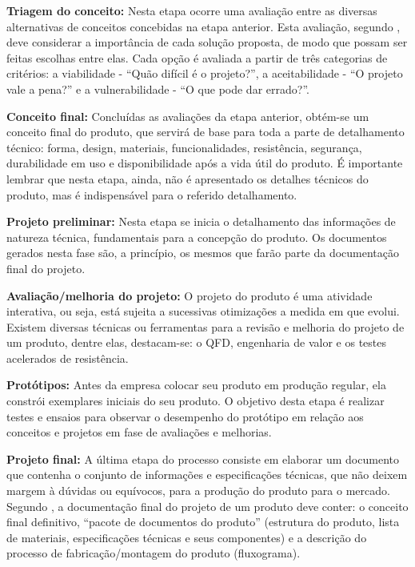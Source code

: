 \textbf{Triagem do conceito:} Nesta etapa ocorre uma avaliação entre as diversas alternativas de conceitos concebidas na etapa anterior. Esta avaliação, segundo \cite{slack2006administracao}, deve considerar a importância de cada solução proposta, de modo que possam ser feitas escolhas entre elas. Cada opção é avaliada a partir de três categorias de critérios: a viabilidade - ``Quão difícil é o projeto?'', a aceitabilidade - ``O projeto vale a pena?'' e a vulnerabilidade - ``O que pode dar errado?''.

\textbf{Conceito final:} Concluídas as avaliações da etapa anterior, obtém-se um conceito final do produto, que servirá de base para toda a parte de detalhamento técnico: forma, design, materiais, funcionalidades, resistência, segurança, durabilidade em uso e disponibilidade após a vida útil do produto. É importante lembrar que nesta etapa, ainda, não é apresentado os detalhes técnicos do produto, mas é indispensável para o referido detalhamento.

\textbf{Projeto preliminar:} Nesta etapa se inicia o detalhamento das informações de natureza técnica, fundamentais para a concepção do produto. Os documentos gerados nesta fase são, a princípio, os mesmos que farão parte da documentação final do projeto.

\textbf{Avaliação/melhoria do projeto:} O projeto do produto é uma atividade interativa, ou seja, está sujeita a sucessivas otimizações a medida em que evolui. Existem diversas técnicas ou ferramentas para a revisão e melhoria do projeto de um produto, dentre elas, destacam-se: o \ac{QFD}, engenharia de valor e os testes acelerados de resistência.

\textbf{Protótipos:} Antes da empresa colocar seu produto em produção regular, ela constrói exemplares iniciais do seu produto. O objetivo desta etapa é realizar testes e ensaios para observar o desempenho do protótipo em relação aos conceitos e projetos em fase de avaliações e melhorias.

\textbf{Projeto final:} A última etapa do processo consiste em elaborar um documento que contenha o conjunto de informações e especificações técnicas, que não deixem margem à dúvidas ou equívocos, para a produção do produto para o mercado. Segundo \cite{slack2006administracao}, a documentação final do projeto de um produto deve conter: o conceito final definitivo, ``pacote de documentos do produto'' (estrutura do produto, lista de materiais, especificações técnicas e seus componentes) e a descrição do processo de fabricação/montagem do produto (fluxograma).


